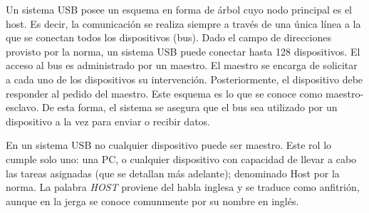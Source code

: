 Un sistema USB posee un esquema %
en forma de árbol cuyo nodo principal es el host. Es decir, la comunicación se realiza siempre a través de una única línea a la que se conectan todos los dispositivos (bus). Dado el campo de direcciones provisto por la norma, un sistema USB puede conectar hasta 128 dispositivos. El acceso al bus es administrado por un maestro. El maestro se encarga de solicitar a cada uno de los dispositivos su intervención. Posteriormente, el dispositivo debe responder al pedido del maestro. Este esquema es lo que se conoce como maestro-esclavo. De esta forma, el sistema se asegura que el bus sea utilizado por un dispositivo a la vez para enviar o recibir datos.%

En un sistema USB no cualquier dispositivo puede ser maestro. Este rol lo cumple solo uno: una PC, o cualquier dispositivo con capacidad de llevar a cabo las tareas asignadas (que se detallan más adelante); denominado Host por la norma. La palabra {\it HOST} proviene del habla inglesa y se traduce como anfitrión, aunque en la jerga se conoce comunmente por su nombre en inglés.%

